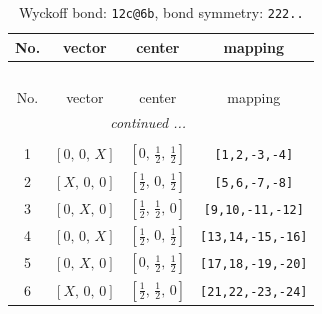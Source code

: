 \documentclass[fleqn,8pt]{jsarticle}
\begin{document}
\begin{longtable}{cccc}
\caption{Wyckoff bond: {\tt 12c@6b}, bond symmetry: {\tt 222..}}
 \\
 \hline \hline
No. & vector & center & mapping \\ \hline \endfirsthead

\multicolumn{3}{l}{\tablename\ \thetable{}} \\
 \hline \hline
No. & vector & center & mapping \\ \hline \endhead

 \hline \hline
\multicolumn{3}{r}{\footnotesize\it continued ...} \\ \endfoot

 \hline \hline
\multicolumn{3}{r}{} \\ \endlastfoot

1 & $\left[ 0,\, 0,\, X \right]$ & $\left[ 0,\, \frac{1}{2},\, \frac{1}{2} \right]$ & {\tt [1,2,-3,-4]} \\ \hline
2 & $\left[ X,\, 0,\, 0 \right]$ & $\left[ \frac{1}{2},\, 0,\, \frac{1}{2} \right]$ & {\tt [5,6,-7,-8]} \\ \hline
3 & $\left[ 0,\, X,\, 0 \right]$ & $\left[ \frac{1}{2},\, \frac{1}{2},\, 0 \right]$ & {\tt [9,10,-11,-12]} \\ \hline
4 & $\left[ 0,\, 0,\, X \right]$ & $\left[ \frac{1}{2},\, 0,\, \frac{1}{2} \right]$ & {\tt [13,14,-15,-16]} \\ \hline
5 & $\left[ 0,\, X,\, 0 \right]$ & $\left[ 0,\, \frac{1}{2},\, \frac{1}{2} \right]$ & {\tt [17,18,-19,-20]} \\ \hline
6 & $\left[ X,\, 0,\, 0 \right]$ & $\left[ \frac{1}{2},\, \frac{1}{2},\, 0 \right]$ & {\tt [21,22,-23,-24]} \\
\end{longtable}
\renewcommand{\arraystretch}{1.2}
\end{document}
